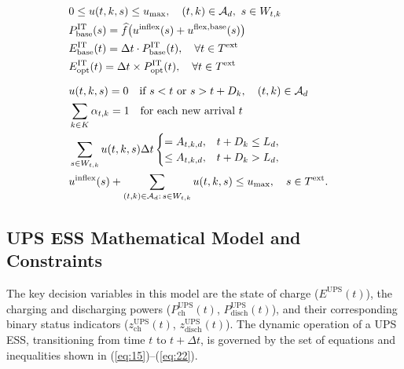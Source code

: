 \documentclass[lettersize,journal]{IEEEtran}
\providecommand{\DIFaddbegin}{}
\providecommand{\DIFaddend}{}
\providecommand{\DIFaddbeginFL}{}
\providecommand{\DIFaddendFL}{}
\begin{document}
\begin{figure}[!t]
\centering
\label{fig:it-workload-equations}
\normalsize
 \DIFaddbeginFL \begingroup\color{blue}
\begin{align}
& 0\leq u(t,k,s)\leq u_{\max},\quad (t,k)\in\mathcal A_d,\ s\in W_{t,k} \label{eq:util_bounds} \\
& P^{\mathrm{IT}}_{\mathrm{base}}(s)=\widehat f\bigl(u^{\mathrm{inflex}}(s)+u^{\mathrm{flex,base}}(s)\bigr) \label{eq:power_base} \\
& E^{\mathrm{IT}}_{\mathrm{base}}(t) = \Delta t \cdot P^{\mathrm{IT}}_{\mathrm{base}}(t), \quad \forall t \in T^{\text{ext}} \label{eq:energy_base} & \\
& E^{\mathrm{IT}}_{\mathrm{opt}}(t) = \Delta t \times P^{\mathrm{IT}}_{\mathrm{opt}}(t), \quad \forall t \in T^{\text{ext}} \label{eq:energy_optimised} & \\[0.4\baselineskip]
& u(t,k,s)=0\quad\text{if }s<t\text{ or }s>t+D_k,\quad (t,k)\in\mathcal A_d \label{eq:feasibility} \\
& \sum_{k\in K}\alpha_{t,k}=1\quad\text{for each new arrival }t \label{eq:alpha_sum} \\
& \sum_{s\in W_{t,k}}u(t,k,s)\Delta t
\begin{cases}=A_{t,k,d},&t+D_k\leq L_d,\\ \leq A_{t,k,d},&t+D_k>L_d,\end{cases} \label{eq:job_completion} \\
& u^{\mathrm{inflex}}(s)+\sum_{(t,k)\in\mathcal A_d:\,s\in W_{t,k}}u(t,k,s)\leq u_{\max},\quad s\in T^{\mathrm{ext}}. \label{eq:cpu_capacity_new}
\end{align}
\endgroup\DIFaddendFL 
\end{figure}

\subsection{UPS ESS Mathematical Model and Constraints}\DIFaddbegin \label{sec:ups-model}

\DIFaddend 

 The key decision variables in this model are the state of charge ($E^{\mathrm{UPS}}(t)$), the charging and discharging powers ($P^{\mathrm{UPS}}_{\mathrm{ch}}(t)$, $P^{\mathrm{UPS}}_{\mathrm{disch}}(t)$), and their corresponding binary status indicators ($z^{\mathrm{UPS}}_{\mathrm{ch}}(t)$, $z^{\mathrm{UPS}}_{\mathrm{disch}}(t)$). The dynamic operation of a UPS ESS, transitioning from time \(t\) to \(t+\Delta t\), is governed by the set of equations and inequalities shown in (\ref{eq:15})--(\ref{eq:22}).
\end{document}
